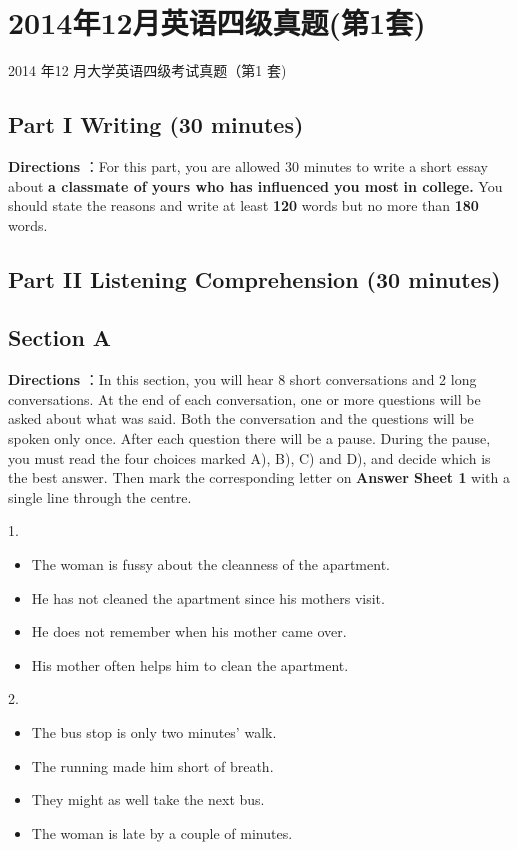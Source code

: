 \documentclass[UTF8,11pt]{ctexart}
\begin{document}
\section*{2014年12月英语四级真题(第1套)}
2014 年12 月大学英语四级考试真题（第1 套)


\subsection*{Part I Writing (30 minutes)}


\textbf{Directions} ：For this part, you are allowed 30 minutes to write a short essay about\textbf{ a classmate of yours who has influenced you most} \textbf{in college.} You should state the reasons and write at least\textbf{ 120} words but no more than\textbf{ 180} words.


\subsection*{Part II Listening Comprehension (30 minutes)}


\subsection*{Section A}


\textbf{Directions} ：In this section, you will hear 8 short conversations and 2 long conversations. At the end of each conversation, one or more questions will be asked about what was said. Both the conversation and the questions will be spoken only once. After each question there will be a pause. During the pause, you must read the four choices marked A), B), C) and D), and decide which is the best answer. Then mark the corresponding letter on\textbf{ Answer Sheet 1} with a single line through the centre.


1.


\begin{itemize}[leftmargin=2em,itemsep=.2em,topsep=.4em]\item[A.] The woman is fussy about the cleanness of the apartment.
\item[B.] He has not cleaned the apartment since his mothers visit.
\item[C.] He does not remember when his mother came over.
\item[D.] His mother often helps him to clean the apartment.
\end{itemize}

2.


\begin{itemize}[leftmargin=2em,itemsep=.2em,topsep=.4em]\item[A.] The bus stop is only two minutes’ walk.
\item[B.] The running made him short of breath.
\item[C.] They might as well take the next bus.
\item[D.] The woman is late by a couple of minutes.
\end{itemize}
\end{document}
